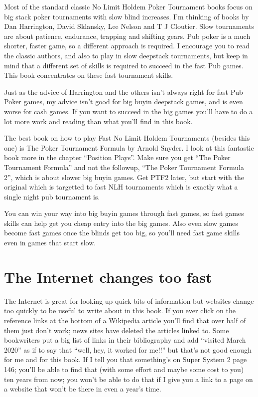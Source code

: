 
Most of the standard classic No Limit Holdem Poker Tournament books
focus on big stack poker tournaments with slow blind increases.
I'm thinking of books by Dan Harrington, David Sklansky, Lee Nelson
and T J Cloutier. Slow tournaments are about patience, endurance,
trapping and shifting gears. Pub poker is a much
shorter, faster game, so a different approach
is required. I encourage you to read the
classic authors, and also to play in slow deepstack tournaments,
but keep in mind that a different set of skills is required to succeed
in the fast Pub games. This book concentrates on these fast
tournament skills.

Just as the advice of Harrington and the others isn't always right
for fast Pub Poker games, my advice isn't good
for big buyin deepstack games, and is even worse for
cash games. If you want to succeed in the big games you'll have to do a
lot more work and reading than what you'll find in this book.

The best book on how to play Fast No Limit Holdem Tournaments
(besides this one) is The Poker Tournament Formula by Arnold Snyder.
I look at this fantastic book more in the chapter ``Position Plays''.
Make sure you get ``The Poker Tournament Formula'' and not the followup,
``The Poker Tournament Formula 2'', which is about slower big buyin games.
Get PTF2 later, but start with the original which is targetted to fast
NLH tournaments which is exactly what a single night pub tournament is.

You can win your way into big buyin games through fast games,
so fast games skills can help get you cheap entry into the big games.
Also even slow games become fast games once the blinds get too big,
so you'll need fast game skills even in games that start slow.

\section{The Internet changes too fast}

The Internet is great for looking up quick bits of information but
websites change too quickly to be useful to write about in this book.
If you  ever click on the reference links at the bottom of a
Wikipedia article you'll find that over half of them just don't work;
news sites have deleted the articles linked to. Some bookwriters put a
big list of links in their bibliography and add ``visited March 2020''
as if to say that ``well, hey, it worked for me!!'' but that's not
good enough for me and for this book. If I tell you that something's
on Super System 2 page 146; you'll be able to find that (with some
effort and maybe some cost to you) ten years from now; you won't be
able to do that if I give you a link to a page on a website that won't
be there in even a year's time.

